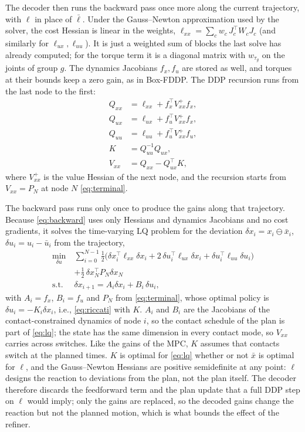 \documentclass[conference]{IEEEtran}
\newcommand{\T}{^{\top}}
\newcommand{\xb}{\bar{x}}
\newcommand{\ub}{\bar{u}}
\begin{document}
The decoder then runs the backward pass once more along the current trajectory, with $\ell$ in place of $\bar\ell$.
Under the Gauss--Newton approximation used by the solver, the cost Hessian is linear in the weights, $\ell_{xx}=\sum_c w_c\,J_c\T W_cJ_c$ (and similarly for $\ell_{ux},\ell_{uu}$).
It is just a weighted sum of blocks the last solve has already computed; for the torque term it is a diagonal matrix with $w_{\tau_g}$ on the joints of group $g$.
The dynamics Jacobians $f_x,f_u$ are stored as well, and torques at their bounds keep a zero gain, as in Box-FDDP.
The DDP recursion runs from the last node to the first:
\begin{align}
Q_{xx}&=\ell_{xx}+f_x\T V^{+}_{xx}f_x,\nonumber\\
Q_{ux}&=\ell_{ux}+f_u\T V^{+}_{xx}f_x,\nonumber\\
Q_{uu}&=\ell_{uu}+f_u\T V^{+}_{xx}f_u,\nonumber\\
K&=Q_{uu}^{-1}Q_{ux},\nonumber\\
V_{xx}&=Q_{xx}-Q_{ux}\T K,
\label{eq:backward}
\end{align}
where $V^{+}_{xx}$ is the value Hessian of the next node, and the recursion starts from $V_{xx}=P_N$ at node $N$ \eqref{eq:terminal}.

The backward pass runs only once to produce the gains along that trajectory.
Because \eqref{eq:backward} uses only Hessians and dynamics Jacobians and no cost gradients, it solves the time-varying LQ problem for the deviation $\delta x_i=x_i\ominus\xb_i$, $\delta u_i=u_i-\ub_i$ from the trajectory,
\begin{align}
\min_{\delta u}\ &\textstyle\sum_{i=0}^{N-1}\tfrac12\big(\delta x_i\T\ell_{xx}\delta x_i+2\,\delta u_i\T\ell_{ux}\delta x_i+\delta u_i\T\ell_{uu}\delta u_i\big)\nonumber\\
&+\tfrac12\,\delta x_N\T P_N\delta x_N\nonumber\\
\text{s.t.}\ &\delta x_{i+1}=A_i\delta x_i+B_i\,\delta u_i,
\label{eq:lq}
\end{align}
with $A_i=f_x$, $B_i=f_u$ and $P_N$ from \eqref{eq:terminal}, whose optimal policy is $\delta u_i=-K_i\delta x_i$, i.e., \eqref{eq:riccati} with $K$.
$A_i$ and $B_i$ are the Jacobians of the contact-constrained dynamics of node $i$, so the contact schedule of the plan is part of \eqref{eq:lq}; the state has the same dimension in every contact mode, so $V_{xx}$ carries across switches. Like the gains of the MPC, $K$ assumes that contacts switch at the planned times.
$K$ is optimal for \eqref{eq:lq} whether or not $\xb$ is optimal for $\ell$, and the Gauss--Newton Hessians are positive semidefinite at any point: $\ell$ designs the reaction to deviations from the plan, not the plan itself.
The decoder therefore discards the feedforward term and the plan update that a full DDP step on $\ell$ would imply; only the gains are replaced, so the decoded gains change the reaction but not the planned motion, which is what bounds the effect of the refiner.
\end{document}
